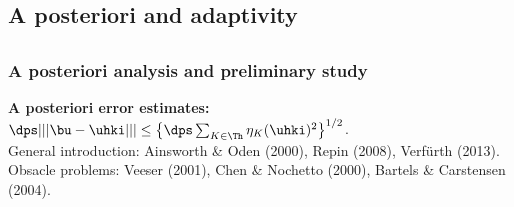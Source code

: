 \documentclass{beamer}
\begin{document}
\begin{frame}
\section{A posteriori and adaptivity}
\subsection{}
\frametitle{A posteriori analysis and preliminary study}
\alert{\textbf{A posteriori error estimates:}}
$\dps |||\bu-\uhki||| \leq \left\{\dps \sum_{\substack{K \in\Th}} \eta_K(\uhki)^2\right\}^{1/2}$.\\
General introduction: Ainsworth \& Oden (2000), Repin (2008), Verf\"urth (2013). 
Obsacle problems: Veeser (2001), Chen \& Nochetto (2000), Bartels \& Carstensen (2004).



\end{frame}
\end{document}
